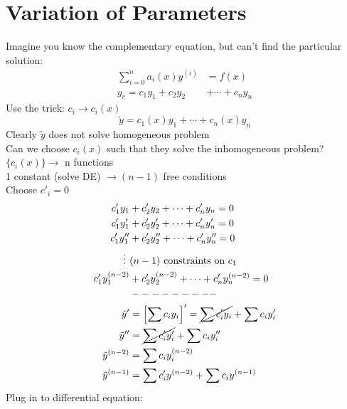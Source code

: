 \documentclass[Maths.tex]{subfiles}
\begin{document}
\section{Variation of Parameters}
Imagine you know the complementary equation, but can't find the particular solution:
\begin{align}
    \sum_{i=0}^n a_i(x)y^{(i)} &= f(x) \\
    y_c = c_1y_1 + c_2y_2 &+ \cdots + c_ny_n
\end{align}
Use the trick: $c_i \to c_i(x)$
\begin{equation}
    \tilde{y} = c_1(x)y_1 + \cdots + c_n(x)y_n
\end{equation}
Clearly $\tilde{y}$ does not solve homogeneous problem \\
Can we choose $c_i(x)$ such that they solve the inhomogeneous problem? \\
$\{c_i(x)\} \to$ n functions \\
1 constant (solve DE) $\to (n-1)$ free conditions \\
Choose $c'_i = 0$
\begin{align}
    c'_1y_1 &+ c'_2y_2 + \cdots + c'_ny_n = 0 \\
    c'_1y'_1 &+ c'_2y'_2 + \cdots + c'_ny'_n = 0 \\
    c'_1y''_1 &+ c'_2y''_2 + \cdots + c'_ny''_n = 0 \\
    \vdots ~ &(n-1) \text{ constraints on }c_1 \\
    c'_1y^{(n-2)}_1 &+ c'_2y^{(n-2)}_2 + \cdots + c'_ny^{(n-2)}_n = 0 \\
    & --------- \\
    \tilde{y}' &= \left[\sum c_iy_i\right]' = \cancel{\sum c'_iy_i} + \sum c_iy'_i \\
    \tilde{y}'' &= \cancel{\sum c'_iy'_i} + \sum c_iy''_i \\
    \tilde{y}^{(n-2)} &= \sum c_iy_i^{(n-2)} \\
    \tilde{y}^{(n-1)} &= \sum c'_iy^{(n-2)} + \sum c_iy^{(n-1)}
\end{align}
Plug in to differential equation:
\end{document}
